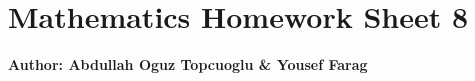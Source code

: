\documentclass{article}
\begin{document}
\section*{\huge Mathematics Homework Sheet 8}
\begin{flushright}
   \textbf{Author: Abdullah Oguz Topcuoglu \& Yousef Farag}
\end{flushright}
\end{document}
